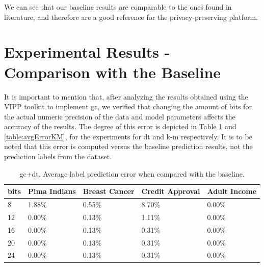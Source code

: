 We can see that our baseline results are comparable to the ones found in literature, and therefore are a good reference for the privacy-preserving platform.


\section{Experimental Results - Comparison with the Baseline}
\label{sec:ExperimentalResultsComparisonBaseline}

It is important to mention that, after analyzing the results obtained using the VIPP toolkit to implement \ac{gc}, we verified that changing the amount of bits for the actual numeric precision of the data and model parameters affects the accuracy of the results. The degree of this error is depicted in Table \ref{table:avgErrorDT} and \ref{table:avgErrorKM}, for the experiments for \ac{dt} and \ac{k-m} respectively. It is to be noted that this error is computed versus the baseline prediction results, not the prediction labels from the dataset. 

\begin{table}[htp]
\centering
\caption{\acs{gc}+\acs{dt}. Average label prediction error when compared with the baseline.}
\label{table:avgErrorDT}
\begin{tabular}{|l|l|l|l|l|}
\hline
\textbf{bits} & \textbf{Pima Indians} & \textbf{Breast Cancer} & \textbf{Credit Approval} & \textbf{Adult Income} \\ \hline
8    & 1.88\%       & 0.55\%        & 8.70\%          & 0.00\%       \\ \hline
12   & 0.00\%       & 0.13\%        & 1.11\%          & 0.00\%       \\ \hline
16   & 0.00\%       & 0.13\%        & 0.31\%          & 0.00\%       \\ \hline
20   & 0.00\%       & 0.13\%        & 0.31\%          & 0.00\%       \\ \hline
24   & 0.00\%       & 0.13\%        & 0.31\%          & 0.00\%       \\ \hline
\end{tabular}
\end{table}


